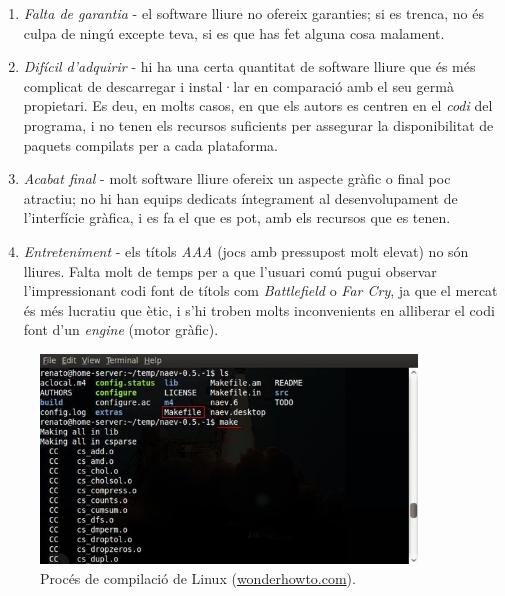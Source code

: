 \begin{enumerate}
\item \emph{Falta de garantia} - el software lliure no ofereix garanties; si es trenca, no és culpa de ningú excepte teva, si es que has fet alguna cosa malament.
\item \emph{Difícil d'adquirir} - hi ha una certa quantitat de software lliure que és més complicat de descarregar i instal·lar en comparació amb el seu germà propietari. Es deu, en molts casos, en que els autors es centren en el \emph{codi} del programa, i no tenen els recursos suficients per assegurar la disponibilitat de paquets compilats per a cada plataforma.
\item \emph{Acabat final} - molt software lliure ofereix un aspecte gràfic o final poc atractiu; no hi han equips dedicats íntegrament al desenvolupament de l'interfície gràfica, i es fa el que es pot, amb els recursos que es tenen.
\item \emph{Entreteniment} - els títols \emph{AAA} (jocs amb pressupost molt elevat) no són lliures. Falta molt de temps per a que l'usuari comú pugui observar l'impressionant codi font de títols com \emph{Battlefield} o \emph{Far Cry}, ja que el mercat és més lucratiu que ètic, i s'hi troben molts inconvenients en alliberar el codi font d'un \emph{engine} (motor gràfic).
\end{enumerate}

\begin{figure}[ht!]
\centering
\includegraphics[width=100mm]{data/linuxcompile.jpg}
\caption{Procés de compilació de Linux (\href{http://renatonel.wonderhowto.com/inspiration/first-steps-compiling-program-linux-0127658/}{wonderhowto.com}).}
\label{websshare}
\end{figure}
